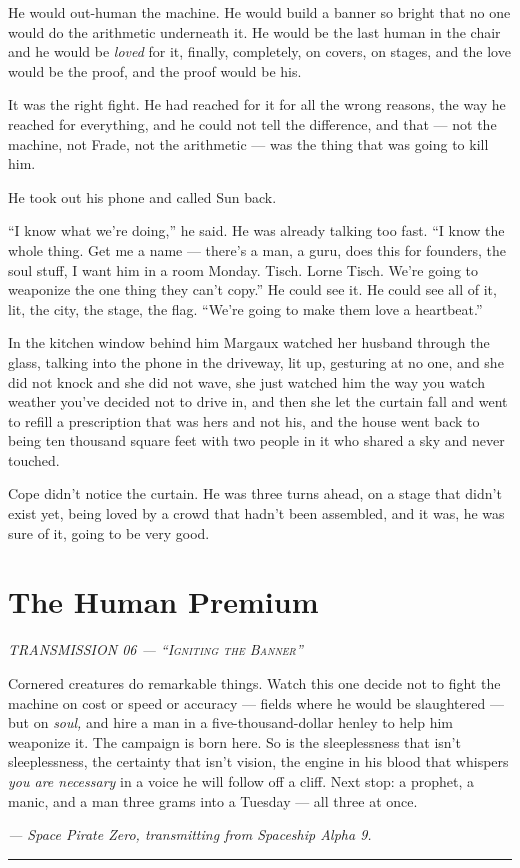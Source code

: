 \documentclass[11pt,openany]{book}
\newcommand{\transheader}{\normalfont\footnotesize\scshape\letterspace}
\newcommand{\letterspace}{}
\newenvironment{transmission}{%
  \par\vspace{0.3\baselineskip}\begin{center}\begin{minipage}{0.88\textwidth}%
  \itshape\small\setlength{\parindent}{0pt}\setstretch{1.06}}%
  {\end{minipage}\end{center}\vspace{0.4\baselineskip}%
  \noindent\hfil\rule{0.35\textwidth}{0.3pt}\hfil\par\vspace{1.0\baselineskip}}
\begin{document}
He would out-human the machine. He would build a banner so bright that no one would do the arithmetic underneath it. He would be the last human in the chair and he would be \textit{loved} for it, finally, completely, on covers, on stages, and the love would be the proof, and the proof would be his.

It was the right fight. He had reached for it for all the wrong reasons, the way he reached for everything, and he could not tell the difference, and that --- not the machine, not Frade, not the arithmetic --- was the thing that was going to kill him.

He took out his phone and called Sun back.

``I know what we're doing,'' he said. He was already talking too fast. ``I know the whole thing. Get me a name --- there's a man, a guru, does this for founders, the soul stuff, I want him in a room Monday. Tisch. Lorne Tisch. We're going to weaponize the one thing they can't copy.'' He could see it. He could see all of it, lit, the city, the stage, the flag. ``We're going to make them love a heartbeat.''

In the kitchen window behind him Margaux watched her husband through the glass, talking into the phone in the driveway, lit up, gesturing at no one, and she did not knock and she did not wave, she just watched him the way you watch weather you've decided not to drive in, and then she let the curtain fall and went to refill a prescription that was hers and not his, and the house went back to being ten thousand square feet with two people in it who shared a sky and never touched.

Cope didn't notice the curtain. He was three turns ahead, on a stage that didn't exist yet, being loved by a crowd that hadn't been assembled, and it was, he was sure of it, going to be very good.

\clearpage
\chapter{The Human Premium}

\begin{transmission}
{\transheader TRANSMISSION 06 --- ``Igniting the Banner''}\par\vspace{0.5em}
Cornered creatures do remarkable things. Watch this one decide not to fight the machine on cost or speed or accuracy --- fields where he would be slaughtered --- but on \textit{soul,} and hire a man in a five-thousand-dollar henley to help him weaponize it. The campaign is born here. So is the sleeplessness that isn't sleeplessness, the certainty that isn't vision, the engine in his blood that whispers \textit{you are necessary} in a voice he will follow off a cliff. Next stop: a prophet, a manic, and a man three grams into a Tuesday --- all three at once.\par
\vspace{0.5em}\hfill\textit{--- Space Pirate Zero, transmitting from Spaceship Alpha 9.}\par
\end{transmission}
\end{document}

